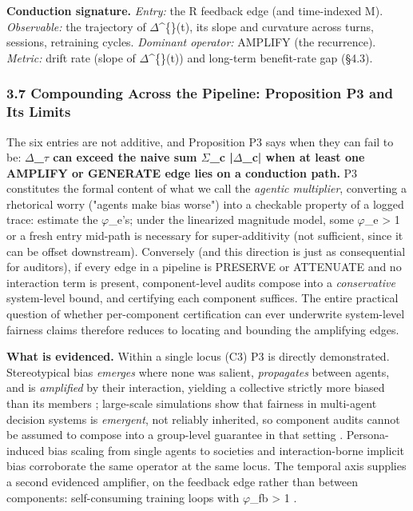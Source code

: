 \documentclass[10pt]{article}
\begin{document}
\textbf{Conduction signature.} \emph{Entry:} the R feedback edge (and time-indexed M). \emph{Observable:} the trajectory of $\Delta$\textasciicircum\{\}(t), its slope and curvature across turns, sessions, retraining cycles. \emph{Dominant operator:} AMPLIFY (the recurrence). \emph{Metric:} drift rate (slope of $\Delta$\textasciicircum\{\}(t)) and long-term benefit-rate gap \cite{xu2024adapting} (\S{}4.3).

\subsubsection*{3.7 Compounding Across the Pipeline: Proposition P3 and Its Limits}

The six entries are not additive, and Proposition P3 says when they can fail to be: \textbf{$\Delta$\_$\tau$ can exceed the naive sum $\Sigma$\_c |$\Delta$\_c| when at least one AMPLIFY or GENERATE edge lies on a conduction path.} P3 constitutes the formal content of what we call the \emph{agentic multiplier}, converting a rhetorical worry ("agents make bias worse") into a checkable property of a logged trace: estimate the $\varphi$\_e's; under the linearized magnitude model, some $\varphi$\_e > 1 or a fresh entry mid-path is necessary for super-additivity (not sufficient, since it can be offset downstream). Conversely (and this direction is just as consequential for auditors), if every edge in a pipeline is PRESERVE or ATTENUATE and no interaction term is present, component-level audits compose into a \emph{conservative} system-level bound, and certifying each component suffices. The entire practical question of whether per-component certification can ever underwrite system-level fairness claims therefore reduces to locating and bounding the amplifying edges.

\textbf{What is evidenced.} Within a single locus (C3) P3 is directly demonstrated. Stereotypical bias \emph{emerges} where none was salient, \emph{propagates} between agents, and is \emph{amplified} by their interaction, yielding a collective strictly more biased than its members \cite{nguyen2025social}; large-scale simulations show that fairness in multi-agent decision systems is \emph{emergent}, not reliably inherited, so component audits cannot be assumed to compose into a group-level guarantee in that setting \cite{madigan2025emergent}. Persona-induced bias scaling from single agents to societies \cite{li2025from} and interaction-borne implicit bias \cite{borah2024implicit} corroborate the same operator at the same locus. The temporal axis supplies a second evidenced amplifier, on the feedback edge rather than between components: self-consuming training loops with $\varphi$\_fb > 1 \cite{wyllie2024fairness,wang2026observations,mansoury2020feedback}.
\end{document}
